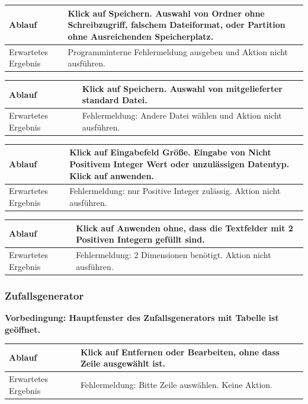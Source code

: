 \documentclass[11pt,a4paper]{article}
\begin{document}
\begin{longtable}[m]{|m{3cm}|m{10cm}|}
\hline
Ablauf&Klick auf Speichern. Auswahl von Ordner ohne Schreibzugriff, falschem Dateiformat, oder Partition ohne Ausreichenden Speicherplatz.\\
\hline
Erwartetes Ergebnis&Programminterne Fehlermeldung ausgeben und Aktion nicht ausführen.\\
\hline
\end{longtable}

\begin{longtable}[m]{|m{3cm}|m{10cm}|}
\hline
Ablauf&Klick auf Speichern. Auswahl von mitgelieferter standard Datei.\\
\hline
Erwartetes Ergebnis&Fehlermeldung: Andere Datei wählen und Aktion nicht ausführen.\\
\hline
\end{longtable}

\begin{longtable}[m]{|m{3cm}|m{10cm}|}
\hline
Ablauf&Klick auf Eingabefeld Größe. Eingabe von Nicht Positivem Integer Wert oder unzulässigen Datentyp. Klick auf anwenden.\\
\hline
Erwartetes Ergebnis&Fehlermeldung: nur Positive Integer zulässig. Aktion nicht ausführen.\\
\hline
\end{longtable}

\begin{longtable}[m]{|m{3cm}|m{10cm}|}
\hline
Ablauf&Klick auf Anwenden ohne, dass die Textfelder mit 2 Positiven Integern gefüllt sind.\\
\hline
Erwartetes Ergebnis&Fehlermeldung: 2 Dimensionen benötigt. Aktion nicht ausführen.\\
\hline
\end{longtable}

\newpage 

\subsubsection{Zufallsgenerator}

\textbf{Vorbedingung: Hauptfenster des Zufallsgenerators mit Tabelle ist geöffnet.}

\begin{longtable}[m]{|m{3cm}|m{10cm}|}
\hline
Ablauf&Klick auf Entfernen oder Bearbeiten, ohne dass Zeile ausgewählt ist.\\
\hline
Erwartetes Ergebnis&Fehlermeldung: Bitte Zeile auswählen. Keine Aktion.\\
\hline
\end{longtable}
\end{document}
